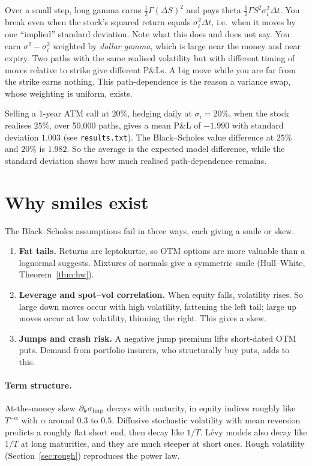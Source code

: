 \begin{intuition}
Over a small step, long gamma earns $\tfrac12\Gamma(\Delta S)^2$ and pays theta $\tfrac12\Gamma S^2\sigma_i^2\Delta t$. You break even when the stock's squared return equals $\sigma_i^2\Delta t$, i.e.\ when it moves by one ``implied'' standard deviation. Note what this does and does not say. You earn $\sigma^2-\sigma_i^2$ weighted by \emph{dollar gamma}, which is large near the money and near expiry. Two paths with the same realised volatility but with different timing of moves relative to strike give different P\&Ls. A big move while you are far from the strike earns nothing. This path-dependence is the reason a variance swap, whose weighting is uniform, exists.
\end{intuition}

\begin{numcheck}
Selling a 1-year ATM call at $20\%$, hedging daily at $\sigma_i=20\%$, when the stock realises $25\%$, over 50{,}000 paths, gives a mean P\&L of $-1.990$ with standard deviation $1.003$ (see \texttt{results.txt}). The Black--Scholes value difference at $25\%$ and $20\%$ is $1.982$. So the average is the expected model difference, while the standard deviation shows how much realised path-dependence remains.
\end{numcheck}

\section{Why smiles exist}

The Black--Scholes assumptions fail in three ways, each giving a smile or skew.
\begin{enumerate}
\item \textbf{Fat tails.} Returns are leptokurtic, so OTM options are more valuable than a lognormal suggests. Mixtures of normals give a symmetric smile (Hull--White, Theorem~\ref{thm:hw}).
\item \textbf{Leverage and spot--vol correlation.} When equity falls, volatility rises. So large down moves occur with high volatility, fattening the left tail; large up moves occur at low volatility, thinning the right. This gives a skew.
\item \textbf{Jumps and crash risk.} A negative jump premium lifts short-dated OTM puts. Demand from portfolio insurers, who structurally buy puts, adds to this.
\end{enumerate}

\paragraph{Term structure.} At-the-money skew $\partial_k\sigma_{\rm imp}$ decays with maturity, in equity indices roughly like $T^{-\alpha}$ with $\alpha$ around $0.3$ to $0.5$. Diffusive stochastic volatility with mean reversion predicts a roughly flat short end, then decay like $1/T$. L\'evy models also decay like $1/T$ at long maturities, and they are much steeper at short ones. Rough volatility (Section~\ref{sec:rough}) reproduces the power law.

